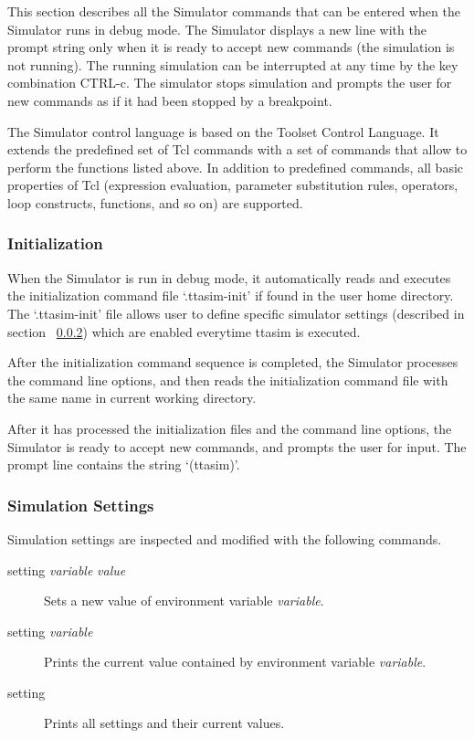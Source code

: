 \documentclass[a4paper,twoside]{tceusermanual}
\begin{document}
This section describes all the Simulator commands that can be entered when
the Simulator runs in debug mode.  The Simulator displays a new line with
the prompt string only when it is ready to accept new commands (the simulation
is not running).  The running simulation can be interrupted at any time by
the key combination CTRL-c.  The simulator stops simulation and prompts the
user for new commands as if it had been stopped by a breakpoint.

The Simulator control language is based on the Toolset Control
Language.  It extends the predefined set of Tcl commands
with a set of commands that allow to perform the functions listed above.  In
addition to predefined commands, all basic properties of Tcl (expression
evaluation, parameter substitution rules, operators, loop constructs,
functions, and so on) are supported.

\subsubsection{Initialization}

When the Simulator is run in debug mode, it automatically reads and executes
the initialization command file `.ttasim-init' if found in the user home
directory. The `.ttasim-init' file allows user to define specific simulator
settings (described in section ~\ref{ssec:debug-set}) which are enabled
everytime ttasim is executed.

After the initialization command sequence is completed, the
Simulator processes the command line options, and then reads the
initialization command file with the same name in current working directory.

After it has processed the initialization files and the command line options,
the Simulator is ready to accept new commands, and prompts the user for
input. The prompt line contains the string `(ttasim)'.

\subsubsection{Simulation Settings}
\label{ssec:debug-set}

Simulation settings are inspected and modified with the following commands.

\begin{description}
\item[setting \emph{variable} \emph{value}] %
  Sets a new value of environment variable \emph{variable}.
\item[setting \emph{variable}] %
  Prints the current value contained by environment variable
  \emph{variable}.
\item[setting] %
  Prints all settings and their current values. 
\end{description}
\end{document}
